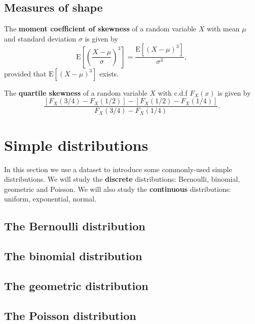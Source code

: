 \documentclass[
  11pt,
  british,
  openany, a4paper]{book}
\begin{document}
\hypertarget{measures-of-shape}{%
\section{Measures of shape}\label{measures-of-shape}}

The \textbf{moment coefficient of skewness} of a random variable \(X\) with mean \(\mu\) and standard deviation \(\sigma\) is given by
\[ \mathrm{E}\left[\left(\frac{X - \mu}{\sigma}\right)^3\right] = \displaystyle\frac{\mathrm{E}\left[\left(X- \mu\right)^3\right]}{\sigma^3}, \]
provided that \(\mathrm{E}[\left(X- \mu\right)^3]\) exists.

The \textbf{quartile skewness} of a random variable \(X\) with c.d.f \(F_X(x)\) is given by
\[ \frac{[F_X(3/4) - F_X(1/2)] - [F_X(1/2) - F_X(1/4)]}{F_X(3/4) - F_X(1/4)}. \]

\hypertarget{simple}{%
\chapter{Simple distributions}\label{simple}}

In this section we use a dataset to introduce some commonly-used simple distributions. We will study the \textbf{discrete} distributions: Bernoulli, binomial, geometric and Poisson. We will also study the \textbf{continuous} distributions: uniform, exponential, normal.

\hypertarget{the-bernoulli-distribution}{%
\section{The Bernoulli distribution}\label{the-bernoulli-distribution}}

\hypertarget{binomial}{%
\section{The binomial distribution}\label{binomial}}

\hypertarget{the-geometric-distribution}{%
\section{The geometric distribution}\label{the-geometric-distribution}}

\hypertarget{the-poisson-distribution}{%
\section{The Poisson distribution}\label{the-poisson-distribution}}
\end{document}
